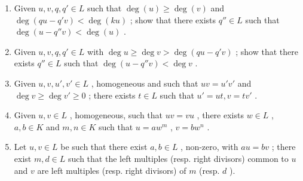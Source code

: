 \begin{enumerate}
\def\labelenumi{\alph{enumi})}
\setcounter{enumi}{1}
\item
  Given \(u, v, q, q' \in L\) such that \(\deg(u) \geqslant \deg(v)\) and \(\deg(qu - q'v) < \deg(ku)\) ; show that there exists \(q'' \in L\) such that \(\deg(u - q''v) < \deg(u)\) .
\item
  Given \(u, v, q, q' \in L\) with \(\deg u \geqslant \deg v > \deg (qu - q'v)\) ; show that there exists \(q'' \in L\) such that \(\deg (u - q''v) < \deg v\) .
\item
  Given \(u, v, u', v' \in L\) , homogeneous and such that \(uv = u'v'\) and \(\deg v \geqslant \deg v' \geqslant 0\) ; there exists \(t \in L\) such that \(u' = ut, v = tv'\) .
\item
  Given \(u, v \in L\) , homogeneous, such that \(uv = vu\) , there exists \(w \in L\) , \(a, b \in K\) and \(m, n \in K\) such that \(u = aw^m\) , \(v = bw^n\) .
\item
  Let \(u, v \in L\) be such that there exist \(a, b \in L\) , non-zero, with \(au = bv\) ; there exist \(m, d \in L\) such that the left multiples (resp. right divisors) common to \(u\) and \(v\) are left multiples (resp. right divisors) of \(m\) (resp. \(d\) ).
\end{enumerate}

